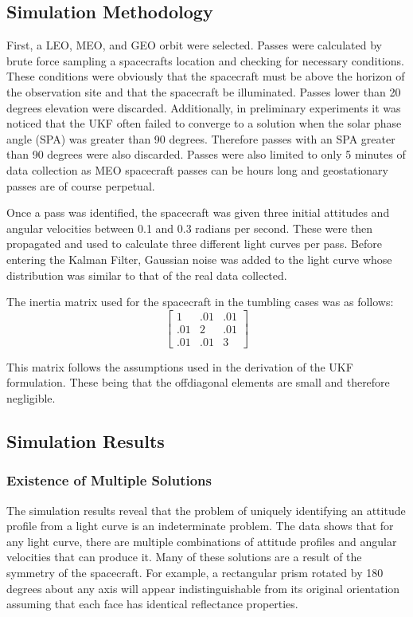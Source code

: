 \subsection{Simulation Methodology}

First, a LEO, MEO, and GEO orbit were selected. Passes were calculated by brute force sampling a spacecrafts location and checking for necessary conditions. These conditions were obviously that the spacecraft must be above the horizon of the observation site and that the spacecraft be illuminated. Passes lower than 20 degrees elevation were discarded. Additionally, in preliminary experiments it was noticed that the UKF often failed to converge to a solution when the solar phase angle (SPA) was greater than 90 degrees. Therefore passes with an SPA greater than 90 degrees were also discarded. Passes were also limited to only 5 minutes of data collection as MEO spacecraft passes can be hours long and geostationary passes are of course perpetual.

Once a pass was identified, the spacecraft was given three initial attitudes and angular velocities between 0.1 and 0.3 radians per second. These were then propagated and used to calculate three different light curves per pass. Before entering the Kalman Filter, Gaussian noise was added to the light curve whose distribution was similar to that of the real data collected.

The inertia matrix used for the spacecraft in the tumbling cases was as follows:
\begin{equation}
\begin{bmatrix}
1 & .01 & .01 \\ .01 & 2 & .01 \\ .01 & .01 &3
\end{bmatrix}
\end{equation}

This matrix follows the assumptions used in the derivation of the UKF formulation. These being that the offdiagonal elements are small and therefore negligible. 
\subsection{Simulation Results}

\subsubsection{Existence of Multiple Solutions}
The simulation results reveal that the problem of uniquely identifying an attitude profile from a light curve is an indeterminate problem. The data shows that for any light curve, there are multiple combinations of attitude profiles and angular velocities that can produce it. Many of these solutions are a result of the symmetry of the spacecraft. For example, a rectangular prism rotated by 180 degrees about any axis will appear indistinguishable from its original orientation assuming that each face has identical reflectance properties.

